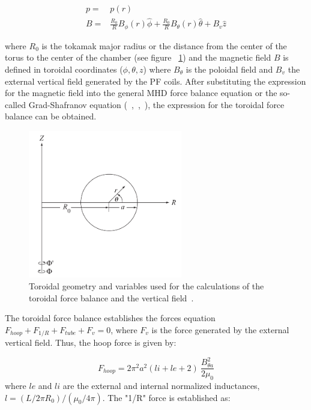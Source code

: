 	\begin{equation}
	\begin{aligned}
	p=&p(r)\\
	B =& \frac{R_0}{R}B_{\phi}(r) \hat{\phi} + \frac{R_0}{R}B_{\theta}(r)\hat{\theta}+B_v \hat{z}
	\end{aligned}
	\end{equation}
	
where $R_0$ is the tokamak major radius or the distance from the center of the torus to the center of the chamber (see figure ~\ref{tor_geo}) and the magnetic field $B$ is defined in toroidal coordinates ($\phi,\theta,z$) where $B_{\theta}$ is the poloidal field and $B_v$ the external vertical field generated by the PF coils. After substituting the expression for the magnetic field into the general MHD force balance equation or the so-called Grad-Shafranov equation (~\cite[Chapter~6]{Miyamoto2011},~\cite[Chapter~11]{Freidberg2007},~\cite[Chpater~2]{Zohm2015}), the expression for the toroidal force balance can be obtained.
\smallskip

\begin{figure}
	\centering
	\includegraphics[width=0.6\textwidth]{Chp1/toroidal_geo.png}
	\caption{  Toroidal geometry and variables used for the calculations of the toroidal force balance and the vertical field~\cite[Chapter~11]{Freidberg2007}.\label{tor_geo}}
\end{figure}


The toroidal force balance establishes the forces equation $F_{hoop}+ F_{1/R} + F_{tube}+ F_{v} =0$, where $F_v$ is the force generated by the external vertical field. Thus, the hoop force is given by:

\begin{equation}
F_{hoop}=2\pi^2a^2(li+le+2)~\frac{B_{\theta a}^2}{2\mu_0}
\end{equation}
 where $le$ and $li$ are the external and internal normalized inductances, $l= (L/2\pi R_0)/(\mu_0/4\pi)$. The "1/R" force is established as:
 
